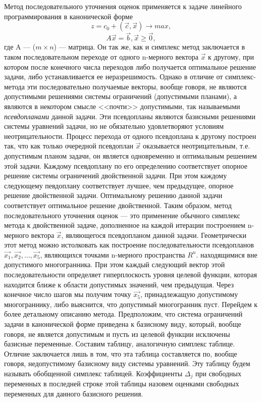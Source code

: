 Метод последовательного уточнения оценок применяется к задаче линейного программирования в канонической форме
\[
z = c_0 + \left(\overrightarrow{c}, \overrightarrow{x}\right) \rightarrow max,
\]
\[
A\overrightarrow{x} = \overrightarrow{b}, \overrightarrow{x} \ge \overrightarrow{0},
\]
где A --- ($m \times n$) — матрица. Он так же, как и симплекс метод заключается в таком последовательном переходе от одного n-мерного вектора $\overrightarrow{x}$ к другому, при котором после конечного числа переходов либо получается оптимальное решение задачи, либо устанавливается ее неразрешимость. Однако в отличие от симплекс-метода эти последовательно получаемые векторы, вообще говоря, не являются допустимыми решениями системы ограничений (допустимыми планами), а являются в некотором смысле <<почти>> допустимыми, так называемыми \textit{псевдопланами} данной задачи. Эти псевдопланы являются базисными решениями системы уравнений задачи, но не обязательно удовлетворяют условиям неотрицательности. Процесс перехода от одного псевдоплана к другому построен так, что как только очередной псевдоплан $\overrightarrow{x}$ оказывается неотрицательным, т.е. допустимым планом задачи, он является одновременно и оптимальным решением этой задачи. Каждому псевдоплану по его определению соответствует опорное решение системы ограничений двойственной задачи. При этом каждому следующему певдоплану соответствует лучшее, чем предыдущее, опорное решение двойственной задачи. Оптимальному решению данной задачи соответствует оптимальное решение двойственной. Таким образом, метод последовательного уточнения оценок — это применение обычного симплекс метода к двойственной задаче, дополненное на каждой итерации построением n-мерного вектора $\overrightarrow{x}$, являющегося псевдопланом данной задачи. Геометрически этот метод можно истолковать как построение последовательности псевдопланов $\overrightarrow{x_1}, \overrightarrow{x_2}, \ldots, \overrightarrow{x_5}$, являющихся точками n-мерного пространства $R^n$. находящимися вне допустимого многогранника. При этом каждый следующий вектор этой последовательности определяет гиперплоскость уровня целевой функции, которая находится ближе к области допустимых значений, чем предыдущая. Через конечное число шагов мы получим точку  $\overrightarrow{x_5}$, принадлежащую допустимому многограннику, либо выяснится, что допустимый многогранник пуст. Перейдем к более детальному описанию метода. Предположим, что система ограничений задачи в канонической форме приведена к базисному виду, который, вообще говоря, не является допустимым и пусть из целевой функции исключены базисные переменные. Составим таблицу, аналогичную симплекс таблице. Отличие заключается лишь в том, что эта таблица составляется по, вообще говоря, недопустимому базисному виду системы уравнений. Эту таблицу будем называть обобщенной симплекс таблицей. Коэффициенты $\Delta_j$ при свободных переменных в последней строке этой таблицы назовем оценками свободных переменных для данного базисного решения. \\


